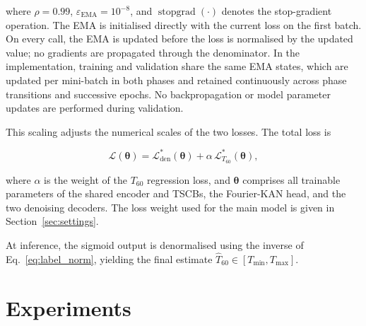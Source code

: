 \documentclass[a4paper,fleqn]{cas-sc}
\begin{document}


\noindent where $\rho=0.99$, $\varepsilon_{\mathrm{EMA}}=10^{-8}$, and $\operatorname{stopgrad}(\cdot)$ denotes the stop-gradient operation. The EMA is initialised directly with the current loss on the first batch. On every call, the EMA is updated before the loss is normalised by the updated value; no gradients are propagated through the denominator. In the implementation, training and validation share the same EMA states, which are updated per mini-batch in both phases and retained continuously across phase transitions and successive epochs. No backpropagation or model parameter updates are performed during validation.



This scaling adjusts the numerical scales of the two losses. The total loss is



\begin{equation}
\mathcal{L}(\boldsymbol{\theta}) = \mathcal{L}_{\text{den}}^{*}(\boldsymbol{\theta}) + \alpha\,\mathcal{L}_{T_{60}}^{*}(\boldsymbol{\theta}), \tag{21}\label{eq:joint_loss}
\end{equation}



\noindent where $\alpha$ is the weight of the $T_{60}$ regression loss, and $\boldsymbol{\theta}$ comprises all trainable parameters of the shared encoder and TSCBs, the Fourier-KAN head, and the two denoising decoders. The loss weight used for the main model is given in Section~\ref{sec:settings}.



At inference, the sigmoid output is denormalised using the inverse of Eq.~\eqref{eq:label_norm}, yielding the final estimate $\hat{T}_{60}\in[T_{\min}, T_{\max}]$.



\section{Experiments}
\label{sec:experiments}


\end{document}
